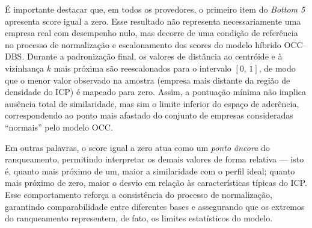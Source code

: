 É importante destacar que, em todos os provedores, o primeiro item do \textit{Bottom 5} apresenta score igual a zero. Esse resultado não representa necessariamente uma empresa real com desempenho nulo, mas decorre de uma condição de referência no processo de normalização e escalonamento dos scores do modelo híbrido OCC--DBS. Durante a padronização final, os valores de distância ao centróide e à vizinhança $k$ mais próxima são reescalonados para o intervalo $[0,\,1]$, de modo que o menor valor observado na amostra (empresa mais distante da região de densidade do ICP) é mapeado para zero. Assim, a pontuação mínima não implica ausência total de similaridade, mas sim o limite inferior do espaço de aderência, correspondendo ao ponto mais afastado do conjunto de empresas consideradas “normais” pelo modelo OCC. 

Em outras palavras, o score igual a zero atua como um \textit{ponto âncora} do ranqueamento, permitindo interpretar os demais valores de forma relativa — isto é, quanto mais próximo de um, maior a similaridade com o perfil ideal; quanto mais próximo de zero, maior o desvio em relação às características típicas do ICP. Esse comportamento reforça a consistência do processo de normalização, garantindo comparabilidade entre diferentes bases e assegurando que os extremos do ranqueamento representem, de fato, os limites estatísticos do modelo.


